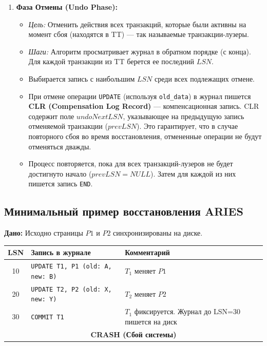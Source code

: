 \documentclass[a4paper,12pt]{article}
\begin{document}
\begin{enumerate}
    \item \textbf{Фаза Отмены (Undo Phase):}
    \begin{itemize}
        \item \textit{Цель:} Отменить действия всех транзакций, которые были активны на момент сбоя (находятся в TT) — так называемые транзакции-лузеры.
        \item \textit{Шаги:} Алгоритм просматривает журнал в обратном порядке (с конца). Для каждой транзакции из TT берется ее последний $LSN$.
        \item Выбирается запись с наибольшим $LSN$ среди всех подлежащих отмене.
        \item При отмене операции \texttt{UPDATE} (используя \texttt{old\_data}) в журнал пишется \textbf{CLR (Compensation Log Record)} — компенсационная запись. CLR содержит поле $undoNextLSN$, указывающее на предыдущую запись отменяемой транзакции ($prevLSN$). Это гарантирует, что в случае повторного сбоя во время восстановления, отмененные операции не будут отменяться дважды.
        \item Процесс повторяется, пока для всех транзакций-лузеров не будет достигнуто начало ($prevLSN = NULL$). Затем для каждой из них пишется запись \texttt{END}.
    \end{itemize}
\end{enumerate}

\subsection{Минимальный пример восстановления ARIES}

\textbf{Дано:} Исходно страницы $P1$ и $P2$ синхронизированы на диске.

\begin{table}[h]
\centering
\begin{tabular}{cll}
\toprule
\textbf{LSN} & \textbf{Запись в журнале} & \textbf{Комментарий} \\
\midrule
10 & \texttt{UPDATE T1, P1 (old: A, new: B)} & $T_1$ меняет $P1$ \\
20 & \texttt{UPDATE T2, P2 (old: X, new: Y)} & $T_2$ меняет $P2$ \\
30 & \texttt{COMMIT T1} & $T_1$ фиксируется. Журнал до LSN=30 пишется на диск \\
\bottomrule
\multicolumn{3}{c}{\textbf{CRASH (Сбой системы)}} \\
\end{tabular}
\end{table}
\end{document}
